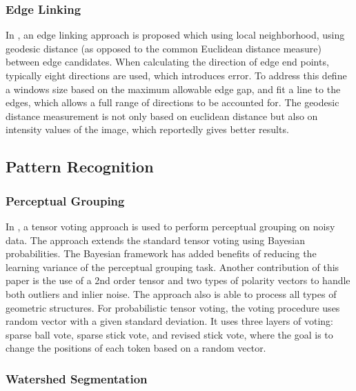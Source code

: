 \subsubsection{Edge Linking}

In \cite{Edge_linking_using_geodesic_distance_neighborhood_information}, an edge linking approach is proposed which using local neighborhood, using geodesic distance (as opposed to the common Euclidean distance measure) between edge candidates. When calculating the direction of edge end points, typically eight directions are used, which introduces error. To address this \cite{Edge_linking_using_geodesic_distance_neighborhood_information} define a windows size based on the maximum allowable edge gap, and fit a line to the edges, which allows a full range of directions to be accounted for. The geodesic distance measurement is not only based on euclidean distance but also on intensity values of the image, which reportedly gives better results.

\subsection{Pattern Recognition}

\subsubsection{Perceptual Grouping}

In \cite{Probabilistic-tensor-voting-robust-perceptual-grouping}, a tensor voting approach is used to perform perceptual grouping on noisy data. The approach extends the standard tensor voting using Bayesian probabilities. The Bayesian framework has added benefits of	reducing the learning variance of the perceptual grouping task. Another	contribution of this paper is the use of a 2nd order tensor and two	types of polarity vectors to handle both outliers and inlier noise. The approach also is able to process all types of geometric structures. For probabilistic tensor voting, the voting procedure uses random vector with a given standard deviation. It uses three layers of voting:	sparse ball vote, sparse stick vote, and revised stick vote, where the goal is to change the positions of each token based on a random vector.


\subsubsection{Watershed Segmentation}

